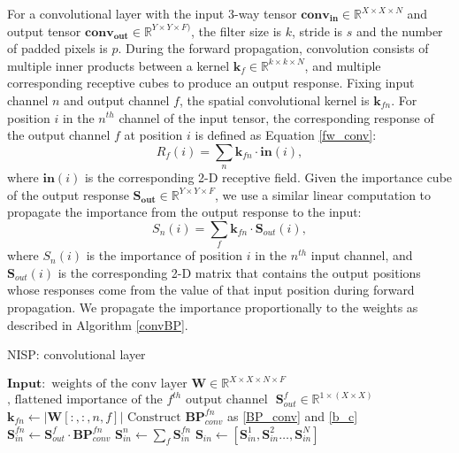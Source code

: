 \documentclass[10pt,twocolumn,letterpaper]{article}
\begin{document}
For a convolutional layer with the input 3-way tensor $\mathbf{{conv_{in}}} \in \mathbb{R}^ {X\times X \times N }$ and output tensor $\mathbf{{conv_{out}}} \in \mathbb{R}^ {Y\times Y \times F )}$, the filter size is $k$, stride is $s$ and the number of padded pixels is $p$.
During the forward propagation, convolution consists of multiple inner products between a kernel $\mathbf{k}_f \in \mathbb{R}^ {k\times k \times N}$, and multiple corresponding receptive cubes to produce an output response.
Fixing input channel $n$ and output channel $f$, the spatial convolutional kernel is $\mathbf{k}_{fn}$. For position $i$ in the $n^{th}$ channel of the input tensor, the corresponding response of the output channel $f$ at position $i$ is defined as Equation \ref{fw_conv}:
\begin{equation}
\label{fw_conv}
R_f(i)=\sum_n \mathbf{k}_{fn} \cdot \mathbf{in}(i),
\end{equation}
where $\mathbf{in}(i)$ is the corresponding 2-D receptive field. 
Given the importance cube of the output response $\mathbf{{S_{out}}} \in \mathbb{R}^ {Y \times Y \times F}$, we use a similar linear computation to propagate the importance from the output response to the input:
\begin{equation}
\label{bw_conv}
S_n(i)=\sum_f \mathbf{k}_{fn} \cdot \mathbf{S}_{out}(i),
\end{equation}
where $S_n(i)$ is the importance of position $i$ in the $n^{th}$ input channel, and $\mathbf{S}_{out}(i)$ is the corresponding 2-D matrix that contains the output positions whose responses come from the value of that input position during forward propagation.
We propagate the importance proportionally to the weights as described in Algorithm \ref{convBP}.
\begin{algorithm}[!t]
\caption{NISP: convolutional layer}\label{convBP}
\begin{algorithmic}[1]
\State $\mathbf{Input: }  \text{ weights of the conv layer } \mathbf{W} \in \mathbb{R}^ {X\times X \times N \times F} $
\State $\text{, flattened importance of the $f^{th}$ output channel }$ \State $\mathbf{S}_{out}^f \in \mathbb{R}^ {1 \times( X \times X )}$
\State $\mathbf{k}_{fn}  \gets |\mathbf{W}[:,:,n,f]|$
\State $\text{Construct } \mathbf{BP}_{conv}^{fn}$ as \eqref{BP_conv} and \eqref{b_c}
\State $\mathbf{S}_{in}^{fn} \gets \mathbf{S}_{out}^f \cdot
\mathbf{BP}_{conv}^{fn}$
\EndFor
\State $\mathbf{S}_{in}^{n} \gets \sum_f \mathbf{S}_{in}^{fn}$
\EndFor
\State $\mathbf{S}_{in} \gets [\mathbf{S}_{in}^{1},\mathbf{S}_{in}^{2} \dots, \mathbf{S}_{in}^{N}]$
\State {}
\end{algorithmic}
\end{algorithm}
\end{document}
